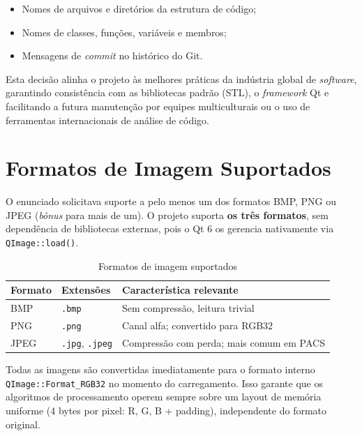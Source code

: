 \documentclass[12pt, a4paper]{article}
\begin{document}
\begin{itemize}
  \item Nomes de arquivos e diretórios da estrutura de código;
  \item Nomes de classes, funções, variáveis e membros;
  \item Mensagens de \textit{commit} no histórico do Git.
\end{itemize}

Esta decisão alinha o projeto às melhores práticas da indústria global de
\textit{software}, garantindo consistência com as bibliotecas padrão (STL), o
\textit{framework} Qt e facilitando a futura manutenção por equipes
multiculturais ou o uso de ferramentas internacionais de análise de código.

\section{Formatos de Imagem Suportados}

O enunciado solicitava suporte a pelo menos um dos formatos BMP, PNG ou JPEG
(\textit{bônus} para mais de um). O projeto suporta \textbf{os três formatos},
sem dependência de bibliotecas externas, pois o Qt 6 os gerencia nativamente
via \texttt{QImage::load()}.

\begin{table}[h!]
\centering
\caption{Formatos de imagem suportados}
\vspace{4pt}
\begin{tabular}{lll}
\toprule
Formato & Extensões & Característica relevante \\
\midrule
BMP  & \texttt{.bmp}              & Sem compressão, leitura trivial \\
PNG  & \texttt{.png}              & Canal alfa; convertido para RGB32 \\
JPEG & \texttt{.jpg}, \texttt{.jpeg} & Compressão com perda; mais comum em PACS \\
\bottomrule
\end{tabular}
\end{table}

Todas as imagens são convertidas imediatamente para o formato interno
\texttt{QImage::Format\_RGB32} no momento do carregamento. Isso garante que os
algoritmos de processamento operem sempre sobre um layout de memória uniforme
(4 bytes por pixel: R, G, B + padding), independente do formato original.

\end{document}
